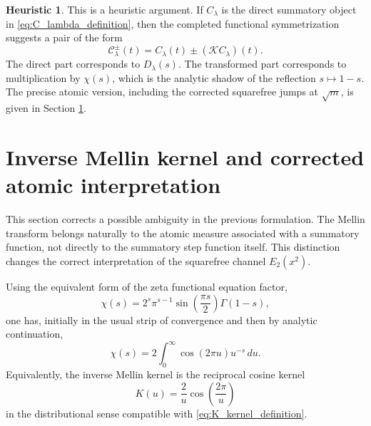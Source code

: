 \documentclass[11pt]{amsart}
\numberwithin{equation}{section}
\theoremstyle{plain}
\theoremstyle{definition}
\newtheorem{heuristic}[theorem]{Heuristic}
\theoremstyle{remark}
\begin{document}
\begin{heuristic}
\label{heur:symmetrized_sum_family}
This is a heuristic argument.  If \(C_\lambda\) is the direct summatory object in \eqref{eq:C_lambda_definition}, then the completed functional symmetrization suggests a pair of the form
\begin{equation}
\mathcal C_\lambda^{\pm}(t)=C_\lambda(t)\pm (\mathcal K C_\lambda)(t).
\label{eq:C_lambda_pm_mellin_sum}
\end{equation}
The direct part corresponds to \(D_\lambda(s)\).  The transformed part corresponds to multiplication by \(\chi(s)\), which is the analytic shadow of the reflection \(s\mapsto 1-s\).  The precise atomic version, including the corrected squarefree jumps at \(\sqrt m\), is given in Section \ref{sec:inverse_mellin_kernel_corrected_atomic}.
\end{heuristic}


\section{Inverse Mellin kernel and corrected atomic interpretation}
\label{sec:inverse_mellin_kernel_corrected_atomic}

This section corrects a possible ambiguity in the previous formulation.  The Mellin transform belongs naturally to the atomic measure associated with a summatory function, not directly to the summatory step function itself.  This distinction changes the correct interpretation of the squarefree channel \(E_2(x^2)\).

Using the equivalent form of the zeta functional equation factor,
\begin{equation}
\chi(s)=2^s\pi^{s-1}\sin\left(\frac{\pi s}{2}\right)\Gamma(1-s),
\label{eq:chi_alternative_form}
\end{equation}
one has, initially in the usual strip of convergence and then by analytic continuation,
\begin{equation}
\chi(s)=2\int_0^\infty \cos(2\pi u)u^{-s}\,du.
\label{eq:chi_cosine_mellin}
\end{equation}
Equivalently, the inverse Mellin kernel is the reciprocal cosine kernel
\begin{equation}
K(u)=\frac{2}{u}\cos\left(\frac{2\pi}{u}\right)
\label{eq:K_reciprocal_cosine_kernel}
\end{equation}
in the distributional sense compatible with \eqref{eq:K_kernel_definition}.
\end{document}
